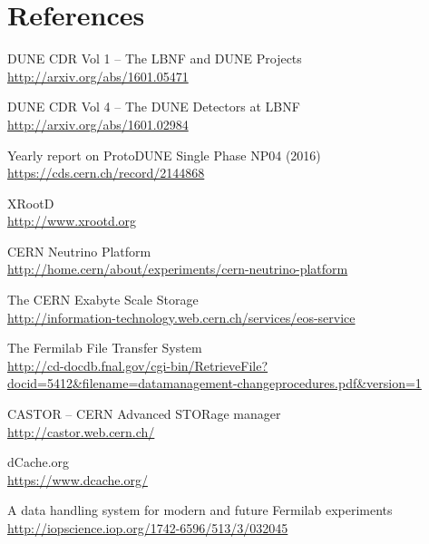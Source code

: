 \documentclass[a4paper]{jpconf}
\begin{document}
\section*{References}
\begin{thebibliography}{9}

 DUNE CDR Vol 1 -- The LBNF and DUNE Projects\\
\url{http://arxiv.org/abs/1601.05471}

 DUNE CDR Vol 4 -- The DUNE Detectors at LBNF\\
\url{http://arxiv.org/abs/1601.02984}

Yearly report on ProtoDUNE Single Phase NP04 (2016)\\
\url{https://cds.cern.ch/record/2144868}

{XRootD}\\
\url{http://www.xrootd.org}

{CERN Neutrino Platform}\\
\url{http://home.cern/about/experiments/cern-neutrino-platform}



{The CERN Exabyte Scale Storage}\\
\url{http://information-technology.web.cern.ch/services/eos-service}

{The Fermilab File Transfer System}\\
\url{http://cd-docdb.fnal.gov/cgi-bin/RetrieveFile?docid=5412&filename=datamanagement-changeprocedures.pdf&version=1}

{CASTOR -- CERN Advanced STORage manager}\\
\url{http://castor.web.cern.ch/}

{dCache.org}\\
\url{https://www.dcache.org/}

{A data handling system for modern and future Fermilab experiments}\\
\url{http://iopscience.iop.org/1742-6596/513/3/032045}

\end{thebibliography}
\end{document}

